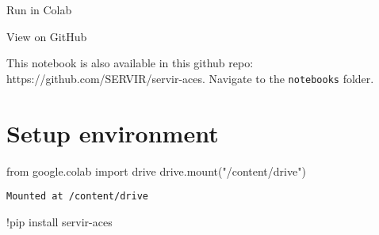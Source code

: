 \documentclass[
  letterpaper,
  DIV=11,
  numbers=noendperiod]{scrreprt}
\newenvironment{Shaded}{\begin{snugshade}}{\end{snugshade}}
\newcommand{\ImportTok}[1]{\textcolor[rgb]{0.00,0.46,0.62}{#1}}
\newcommand{\NormalTok}[1]{\textcolor[rgb]{0.00,0.23,0.31}{#1}}
\newcommand{\OperatorTok}[1]{\textcolor[rgb]{0.37,0.37,0.37}{#1}}
\newcommand{\StringTok}[1]{\textcolor[rgb]{0.13,0.47,0.30}{#1}}
\begin{document}
Run in Colab

View on GitHub

This notebook is also available in this github repo:
https://github.com/SERVIR/servir-aces. Navigate to the
\texttt{notebooks} folder.

\section{Setup environment}\label{setup-environment}

\begin{Shaded}
\begin{Highlighting}[]
\ImportTok{from}\NormalTok{ google.colab }\ImportTok{import}\NormalTok{ drive}
\NormalTok{drive.mount(}\StringTok{"/content/drive"}\NormalTok{)}
\end{Highlighting}
\end{Shaded}

\begin{verbatim}
Mounted at /content/drive
\end{verbatim}

\begin{Shaded}
\begin{Highlighting}[]
\OperatorTok{!}\NormalTok{pip install servir}\OperatorTok{{-}}\NormalTok{aces}
\end{Highlighting}
\end{Shaded}
\end{document}

